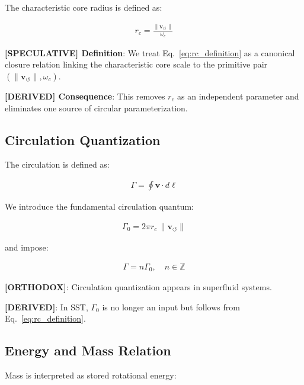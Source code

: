 \documentclass[11pt]{article}
\theoremstyle{definition}
\theoremstyle{plain}
\theoremstyle{remark}
\newcommand{\rc}{{r_c}}
\newcommand{\vnorm}{\lVert \mathbf{v}_{\!\boldsymbol{\circlearrowleft}} \rVert}
\begin{document}
        The characteristic core radius is defined as:
        
        \begin{align}
            \rc = \frac{\vnorm}{\omega_c}
            \label{eq:rc_definition}
        \end{align}
        
        \textbf{[SPECULATIVE] Definition}: We treat Eq.~\eqref{eq:rc_definition} as a canonical closure relation linking the characteristic core scale to the primitive pair $(\vnorm,\omega_c)$.

        \textbf{[DERIVED] Consequence}: This removes $r_c$ as an independent parameter and eliminates one source of circular parameterization.
    
    \subsection{Circulation Quantization}
        
        The circulation is defined as:
        
        \begin{align}
            \Gamma = \oint \mathbf{v} \cdot d\ell
        \end{align}
        
        We introduce the fundamental circulation quantum:
        
        \begin{align}
            \Gamma_0 = 2\pi \rc \, \vnorm
            \label{eq:gamma0}
        \end{align}
        
        and impose:
        
        \begin{align}
            \Gamma = n \Gamma_0, \quad n \in \mathbb{Z}
        \end{align}
        
        \textbf{[ORTHODOX]}: Circulation quantization appears in superfluid systems.
        
        \textbf{[DERIVED]}: In SST, $\Gamma_0$ is no longer an input but follows from Eq.~\ref{eq:rc_definition}.
    
    \subsection{Energy and Mass Relation}
        
        Mass is interpreted as stored rotational energy:
        
\end{document}

